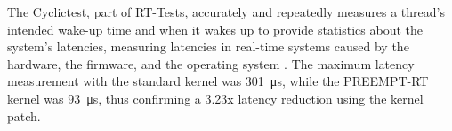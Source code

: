 The Cyclictest, part of RT-Tests, accurately and repeatedly measures a thread's intended wake-up time and when it wakes up to provide statistics about the system's latencies, measuring latencies in real-time systems caused by the hardware, the firmware, and the operating system \cite{costashulCyclictest2023}. The maximum latency measurement with the standard kernel was \SI{301}{\micro\second}, while the PREEMPT-RT kernel was \SI{93}{\micro\second}, thus confirming a 3.23x latency reduction using the kernel patch.
